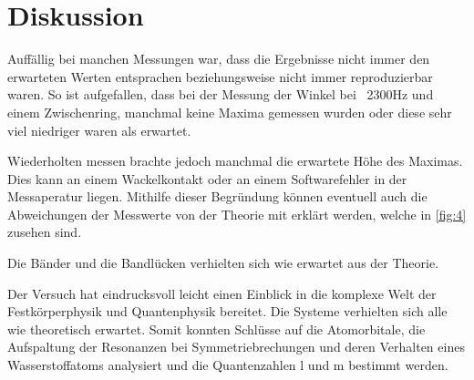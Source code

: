 \section{Diskussion}
\label{sec:Diskussion}

Auffällig bei manchen Messungen war, dass die Ergebnisse nicht immer den erwarteten Werten entsprachen beziehungsweise nicht immer reproduzierbar waren. So ist aufgefallen,
dass bei der Messung der Winkel bei ~2300Hz und einem Zwischenring, manchmal keine Maxima gemessen wurden oder diese sehr viel niedriger waren als erwartet. 

\noindent
Wiederholten messen brachte jedoch manchmal die erwartete Höhe des Maximas. Dies kann an einem Wackelkontakt oder an einem Softwarefehler in der Messaperatur liegen.
Mithilfe dieser Begründung können eventuell auch die Abweichungen der Messwerte von der Theorie mit erklärt werden, welche in \autoref{fig:4} zusehen sind.

\noindent
Die Bänder und die Bandlücken verhielten sich wie erwartet aus der Theorie.

\noindent
Der Versuch hat eindrucksvoll leicht einen Einblick in die komplexe Welt der Festkörperphysik und Quantenphysik bereitet. Die Systeme verhielten sich alle wie 
theoretisch erwartet. Somit konnten Schlüsse auf die Atomorbitale, die Aufspaltung der Resonanzen bei Symmetriebrechungen und deren Verhalten eines Wasserstoffatoms
analysiert und die Quantenzahlen l und m bestimmt werden.


